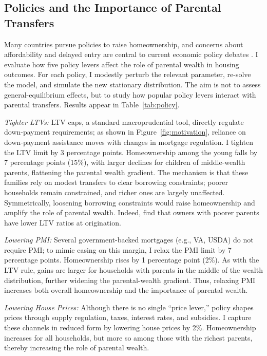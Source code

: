 \documentclass[12pt]{article}
\begin{document}
\subsection{Policies and the Importance of Parental Transfers}
Many countries pursue policies to raise homeownership, and concerns about affordability and delayed entry are central to current economic policy debates \citep[e.g.,][]{Mabille2020}. I evaluate how five policy levers affect the role of parental wealth in housing outcomes. For each policy, I modestly perturb the relevant parameter, re-solve the model, and simulate the new stationary distribution. The aim is not to assess general-equilibrium effects, but to study how popular policy levers interact with parental transfers. Results appear in Table~\ref{tab:policy}.

\textit{Tighter LTVs:} LTV caps, a standard macroprudential tool, directly regulate down-payment requirements; as shown in Figure~\ref{fig:motivation}, reliance on down-payment assistance moves with changes in mortgage regulation. I tighten the LTV limit by 3 percentage points. Homeownership among the young falls by 7 percentage points (15\%), with larger declines for children of middle-wealth parents, flattening the parental wealth gradient. The mechanism is that these families rely on modest transfers to clear borrowing constraints; poorer households remain constrained, and richer ones are largely unaffected. Symmetrically, loosening borrowing constraints would raise homeownership and amplify the role of parental wealth. Indeed, \citet{wold2024housing} find that owners with poorer parents have lower LTV ratios at origination.

\textit{Lowering PMI:} Several government-backed mortgages (e.g., VA, USDA) do not require PMI; to mimic easing on this margin, I relax the PMI limit by 7 percentage points. Homeownership rises by 1 percentage point (2\%). As with the LTV rule, gains are larger for households with parents in the middle of the wealth distribution, further widening the parental-wealth gradient. Thus, relaxing PMI increases both overall homeownership and the importance of parental wealth.

\textit{Lowering House Prices:} Although there is no single “price lever,” policy shapes prices through supply regulation, taxes, interest rates, and subsidies. I capture these channels in reduced form by lowering house prices by 2\%. Homeownership increases for all households, but more so among those with the richest parents, thereby increasing the role of parental wealth.
\end{document}
